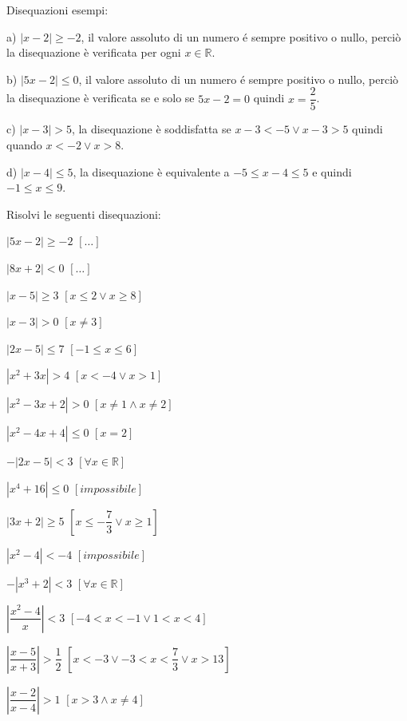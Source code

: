 \begin{esercizio}\label{ese:03.1}
Disequazioni esempi:
\begin{enumeratea}
        \item[a)] $|x-2|\geq -2$, il valore assoluto di un numero é sempre 
positivo o nullo, perciò la disequazione è verificata per ogni $x\in 
\mathbb{R}$.

        \item[b)] $|5x-2|\leq 0$, il valore assoluto di un numero é sempre 
positivo o nullo, perciò la disequazione è verificata se e solo se $5x-2=0$ 
quindi $x=\dfrac{2}{5}$.
        \item[c)] $|x-3|>5$, la disequazione è soddisfatta se $x-3<-5 \vee 
x-3>5$ quindi quando $x<-2 \vee x>8$.
        \item[d)] $|x-4|\leq 5$, la disequazione è equivalente a $-5\leq 
x-4 
\leq 5$ e quindi $-1\leq x \leq 9$.
\end{enumeratea}

\noindent Risolvi le seguenti disequazioni:

\begin{multicols}{2}
\begin{enumeratea}
\item $\left| 5x-2\right| \geq -2 $ \hfill $\left[ \dots \right] $
\item $\left| 8x+2\right| < 0 $ \hfill $\left[ \dots \right] $
\item $\left| x-5\right| \geq 3 $ \hfill $\left[ x\leq 2 \vee x\geq 8 
\right] $
\item $\left| x-3\right| >0 $ \hfill $\left[ x\neq 3 \right] $
\item $\left| 2x-5\right| \leq 7 $ \hfill $\left[ -1\leq x \leq 6 \right] $
\item $\left| x^2+3x\right| >4 $ \hfill $\left[ x<-4 \vee x>1 \right] $
\item $\left| x^2-3x+2\right| >0 $ \hfill $\left[ x\neq 1 \wedge x\neq 2 
\right] 
$
\item $\left| x^2-4x+4\right| \leq 0 $ \hfill $\left[ x=2 \right] $
\item $-\left| 2x-5\right| <3 $ \hfill $\left[ \forall x \in \mathbb{R} 
\right] 
$
\item $\left| x^4+16\right| \leq 0 $ \hfill $\left[ impossibile \right] $
\item $\left| 3x+2\right| \geq 5 $ \hfill $\left[ x\leq -\dfrac{7}{3} \vee 
x\geq 
1 \right] $
\item $\left| x^2-4\right| <-4 $ \hfill $\left[ impossibile \right] $
\item $-\left| x^3+2\right| <3 $ \hfill $\left[ \forall x \in \mathbb{R} 
\right] 
$
\item $\left| \dfrac{x^2-4}{x}\right| <3 $ \hfill $\left[ -4<x<-1 \vee 
1<x<4 
\right] $
\item $\left| \dfrac{x-5}{x+3}\right| >\dfrac{1}{2} $ \hfill $\left[x<-3 
\vee 
-3<x<\dfrac{7}{3} \vee x>13 \right] $
\item $\left| \dfrac{x-2}{x-4}\right| >1 $ \hfill $\left[x>3 \wedge x \neq 
4 
\right] $
\end{enumeratea}
\end{multicols}
\end{esercizio}


